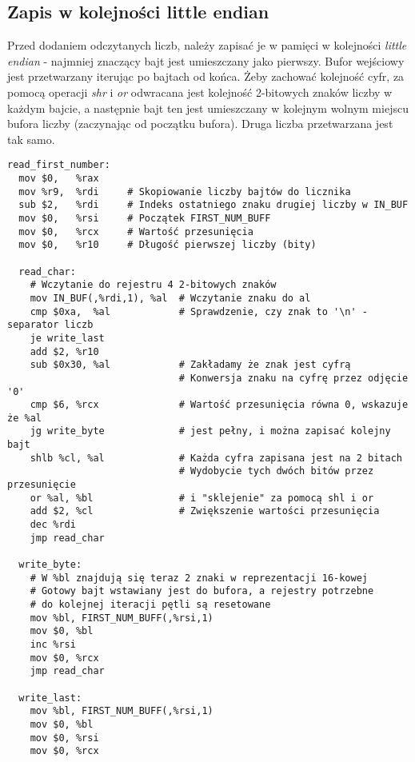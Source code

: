 \documentclass[11pt]{report}
\begin{document}
\subsection{Zapis w kolejności little endian}
Przed dodaniem odczytanych liczb, należy zapisać je w pamięci w kolejności \textit{little endian} - najmniej znaczący bajt jest umieszczany jako pierwszy. Bufor wejściowy jest przetwarzany iterując po bajtach od końca. Żeby zachować kolejność cyfr, za pomocą operacji \textit{shr} i \textit{or} odwracana jest kolejność 2-bitowych znaków liczby w każdym bajcie, a następnie bajt ten jest umieszczany w kolejnym wolnym miejscu bufora liczby (zaczynając od początku bufora). Druga liczba przetwarzana jest tak samo.
\begin{verbatim}
read_first_number:  
  mov $0,   %rax     
  mov %r9,  %rdi     # Skopiowanie liczby bajtów do licznika
  sub $2,   %rdi     # Indeks ostatniego znaku drugiej liczby w IN_BUF
  mov $0,   %rsi     # Początek FIRST_NUM_BUFF
  mov $0,   %rcx     # Wartość przesunięcia
  mov $0,   %r10     # Długość pierwszej liczby (bity)
  
  read_char:
    # Wczytanie do rejestru 4 2-bitowych znaków
    mov IN_BUF(,%rdi,1), %al  # Wczytanie znaku do al
    cmp $0xa,  %al            # Sprawdzenie, czy znak to '\n' - separator liczb
    je write_last
    add $2, %r10
    sub $0x30, %al            # Zakładamy że znak jest cyfrą
                              # Konwersja znaku na cyfrę przez odjęcie '0'
    cmp $6, %rcx              # Wartość przesunięcia równa 0, wskazuje że %al   
    jg write_byte             # jest pełny, i można zapisać kolejny bajt
    shlb %cl, %al             # Każda cyfra zapisana jest na 2 bitach
                              # Wydobycie tych dwóch bitów przez przesunięcie
    or %al, %bl               # i "sklejenie" za pomocą shl i or
    add $2, %cl               # Zwiększenie wartości przesunięcia
    dec %rdi
    jmp read_char
    
  write_byte:
  	# W %bl znajdują się teraz 2 znaki w reprezentacji 16-kowej
  	# Gotowy bajt wstawiany jest do bufora, a rejestry potrzebne
  	# do kolejnej iteracji pętli są resetowane  	
    mov %bl, FIRST_NUM_BUFF(,%rsi,1)
    mov $0, %bl
    inc %rsi
    mov $0, %rcx
    jmp read_char
    
  write_last:
    mov %bl, FIRST_NUM_BUFF(,%rsi,1)
    mov $0, %bl
    mov $0, %rsi
    mov $0, %rcx
\end{verbatim}
\end{document}
